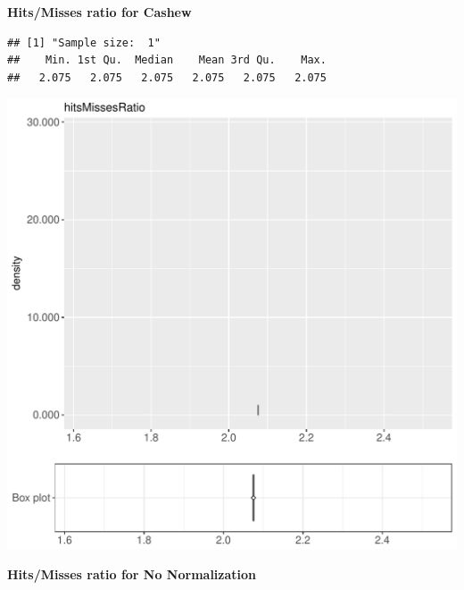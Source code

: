 \documentclass{article}\usepackage[]{graphicx}\usepackage[]{color}
\makeatletter
\def\maxwidth{ %
  \ifdim\Gin@nat@width>\linewidth
    \linewidth
  \else
    \Gin@nat@width
  \fi
}
\newenvironment{kframe}{%
 \def\at@end@of@kframe{}%
 \ifinner\ifhmode%
  \def\at@end@of@kframe{\end{minipage}}%
  \begin{minipage}{\columnwidth}%
 \fi\fi%
 \def\FrameCommand##1{\hskip\@totalleftmargin \hskip-\fboxsep
 \colorbox{shadecolor}{##1}\hskip-\fboxsep
     \hskip-\linewidth \hskip-\@totalleftmargin \hskip\columnwidth}%
 \MakeFramed {\advance\hsize-\width
   \@totalleftmargin\z@ \linewidth\hsize
   \@setminipage}}%
 {\par\unskip\endMakeFramed%
 \at@end@of@kframe}
\newenvironment{knitrout}{}{} %
\makeatother
\begin{document}
 \textbf{Hits/Misses ratio for Cashew}
\begin{knitrout}
\color{fgcolor}\begin{kframe}
\begin{verbatim}
## [1] "Sample size:  1"
##    Min. 1st Qu.  Median    Mean 3rd Qu.    Max. 
##   2.075   2.075   2.075   2.075   2.075   2.075
\end{verbatim}


{\ttfamily\noindent\bfseries{}}\end{kframe}
\includegraphics[width=\maxwidth]{figure/RH5_cashew_crime-1} 

\end{knitrout}
 \textbf{Hits/Misses ratio for No Normalization}
\end{document}
